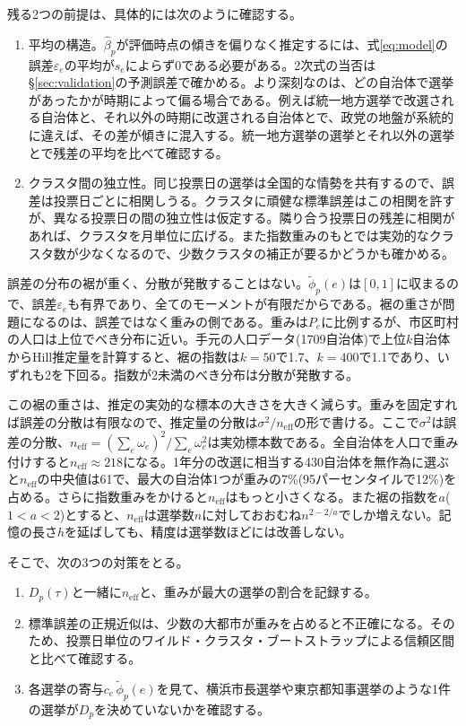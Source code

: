 \documentclass[a4paper,11pt]{ltjsarticle}
\begin{document}
残る2つの前提は、具体的には次のように確認する。

\begin{enumerate}
  \item 平均の構造。$\hat\beta_p$が評価時点の傾きを偏りなく推定するには、式\eqref{eq:model}の誤差$\varepsilon_e$の平均が$s_e$によらず0である必要がある。2次式の当否は\S\ref{sec:validation}の予測誤差で確かめる。より深刻なのは、どの自治体で選挙があったかが時期によって偏る場合である。例えば統一地方選挙で改選される自治体と、それ以外の時期に改選される自治体とで、政党の地盤が系統的に違えば、その差が傾きに混入する。統一地方選挙の選挙とそれ以外の選挙とで残差の平均を比べて確認する。
  \item クラスタ間の独立性。同じ投票日の選挙は全国的な情勢を共有するので、誤差は投票日ごとに相関しうる。クラスタに頑健な標準誤差はこの相関を許すが、異なる投票日の間の独立性は仮定する。隣り合う投票日の残差に相関があれば、クラスタを月単位に広げる。また指数重みのもとでは実効的なクラスタ数が少なくなるので、少数クラスタの補正が要るかどうかも確かめる。
\end{enumerate}

誤差の分布の裾が重く、分散が発散することはない。$\tilde\phi_p(e)$は$[0,1]$に収まるので、誤差$\varepsilon_e$も有界であり、全てのモーメントが有限だからである。裾の重さが問題になるのは、誤差ではなく重みの側である。重みは$P_e$に比例するが、市区町村の人口は上位でべき分布に近い。手元の人口データ(1709自治体)で上位$k$自治体からHill推定量を計算すると、裾の指数は$k=50$で1.7、$k=400$で1.1であり、いずれも2を下回る。指数が2未満のべき分布は分散が発散する。

この裾の重さは、推定の実効的な標本の大きさを大きく減らす。重みを固定すれば誤差の分散は有限なので、推定量の分散は$\sigma^2/n_{\text{eff}}$の形で書ける。ここで$\sigma^2$は誤差の分散、$n_{\text{eff}}=(\sum_e\omega_e)^2/\sum_e\omega_e^2$は実効標本数である。全自治体を人口で重み付けすると$n_{\text{eff}}\approx 218$になる。1年分の改選に相当する430自治体を無作為に選ぶと$n_{\text{eff}}$の中央値は61で、最大の自治体1つが重みの7\%(95パーセンタイルで12\%)を占める。さらに指数重みをかけると$n_{\text{eff}}$はもっと小さくなる。また裾の指数を$a$($1<a<2$)とすると、$n_{\text{eff}}$は選挙数$n$に対しておおむね$n^{2-2/a}$でしか増えない。記憶の長さ$h$を延ばしても、精度は選挙数ほどには改善しない。

そこで、次の3つの対策をとる。

\begin{enumerate}
  \item $D_p(\tau)$と一緒に$n_{\text{eff}}$と、重みが最大の選挙の割合を記録する。
  \item 標準誤差の正規近似は、少数の大都市が重みを占めると不正確になる。そのため、投票日単位のワイルド・クラスタ・ブートストラップによる信頼区間と比べて確認する。
  \item 各選挙の寄与$c_e\,\tilde\phi_p(e)$を見て、横浜市長選挙や東京都知事選挙のような1件の選挙が$D_p$を決めていないかを確認する。
\end{enumerate}
\end{document}
